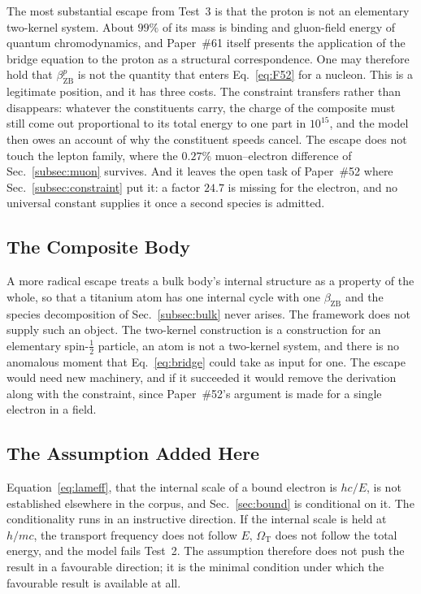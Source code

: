 \documentclass[%
 reprint, amsmath,amssymb, aps, prb, ]{revtex4-2}
\numberwithin{equation}{section}
\newcommand{\betaZB}{\beta_{\text{ZB}}}
\newcommand{\OmT}{\Omega_{\text{T}}}
\begin{document}
The most substantial escape from Test~3 is that the proton is not an elementary two-kernel system. About $99\%$ of its mass is binding and gluon-field energy of quantum chromodynamics, and Paper~\#61 itself presents the application of the bridge equation to the proton as a structural correspondence. One may therefore hold that $\betaZB^{p}$ is not the quantity that enters Eq.~\eqref{eq:F52} for a nucleon. This is a legitimate position, and it has three costs. The constraint transfers rather than disappears: whatever the constituents carry, the charge of the composite must still come out proportional to its total energy to one part in $10^{15}$, and the model then owes an account of why the constituent speeds cancel. The escape does not touch the lepton family, where the $0.27\%$ muon--electron difference of Sec.~\ref{subsec:muon} survives. And it leaves the open task of Paper~\#52 where Sec.~\ref{subsec:constraint} put it: a factor $24.7$ is missing for the electron, and no universal constant supplies it once a second species is admitted.

\subsection{The Composite Body}
\label{subsec:composite_bulk}

A more radical escape treats a bulk body's internal structure as a property of the whole, so that a titanium atom has one internal cycle with one $\betaZB$ and the species decomposition of Sec.~\ref{subsec:bulk} never arises. The framework does not supply such an object. The two-kernel construction is a construction for an elementary spin-$\tfrac12$ particle, an atom is not a two-kernel system, and there is no anomalous moment that Eq.~\eqref{eq:bridge} could take as input for one. The escape would need new machinery, and if it succeeded it would remove the derivation along with the constraint, since Paper~\#52's argument is made for a single electron in a field.

\subsection{The Assumption Added Here}
\label{subsec:assumption}

Equation~\eqref{eq:lameff}, that the internal scale of a bound electron is $hc/E$, is not established elsewhere in the corpus, and Sec.~\ref{sec:bound} is conditional on it. The conditionality runs in an instructive direction. If the internal scale is held at $h/mc$, the transport frequency does not follow $E$, $\OmT$ does not follow the total energy, and the model fails Test~2. The assumption therefore does not push the result in a favourable direction; it is the minimal condition under which the favourable result is available at all.
\end{document}
